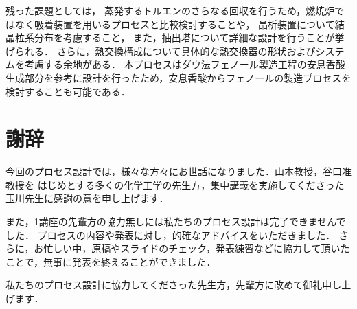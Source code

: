 \documentclass[a4j]{jsreport}
\begin{document}
残った課題としては，
蒸発するトルエンのさらなる回収を行うため，燃焼炉ではなく吸着装置を用いるプロセスと比較検討することや，
晶析装置について結晶粒系分布を考慮すること，
また，抽出塔について詳細な設計を行うことが挙げられる．
さらに，熱交換構成について具体的な熱交換器の形状およびシステムを考慮する余地がある．
本プロセスはダウ法フェノール製造工程の安息香酸生成部分を参考に設計を行ったため，安息香酸からフェノールの製造プロセスを検討することも可能である．


\clearpage
\chapter*{謝辞}
今回のプロセス設計では，様々な方々にお世話になりました．山本教授，谷口准教授を
はじめとする多くの化学工学の先生方，集中講義を実施してくださった玉川先生に感謝の意を申し上げます．

また，1講座の先輩方の協力無しには私たちのプロセス設計は完了できませんでした．
プロセスの内容や発表に対し，的確なアドバイスをいただきました．
さらに，お忙しい中，原稿やスライドのチェック，発表練習などに協力して頂いたことで，無事に発表を終えることができました．

私たちのプロセス設計に協力してくださった先生方，先輩方に改めて御礼申し上げます．
\end{document}
